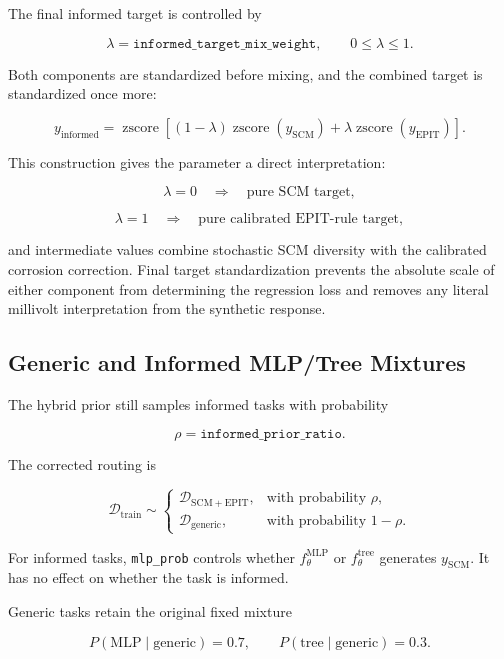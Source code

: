 \documentclass{article}
\begin{document}
The final informed target is controlled by

\[
\lambda
=
\texttt{informed\_target\_mix\_weight},
\qquad
0\leq\lambda\leq1.
\]

Both components are standardized before mixing, and the combined target is
standardized once more:

\begin{equation}
\label{eq:final-v7-scm-epit-target}
y_{\mathrm{informed}}
=
\operatorname{zscore}
\left[
(1-\lambda)
\operatorname{zscore}(y_{\mathrm{SCM}})
+
\lambda
\operatorname{zscore}(y_{\mathrm{EPIT}})
\right].
\end{equation}

This construction gives the parameter a direct interpretation:

\[
\lambda=0
\quad\Longrightarrow\quad
\text{pure SCM target},
\]

\[
\lambda=1
\quad\Longrightarrow\quad
\text{pure calibrated EPIT-rule target},
\]

and intermediate values combine stochastic SCM diversity with the calibrated
corrosion correction. Final target standardization prevents the absolute scale
of either component from determining the regression loss and removes any
literal millivolt interpretation from the synthetic response.

\subsection{Generic and Informed MLP/Tree Mixtures}

The hybrid prior still samples informed tasks with probability

\[
\rho
=
\texttt{informed\_prior\_ratio}.
\]

The corrected routing is

\[
\mathcal{D}_{\mathrm{train}}
\sim
\begin{cases}
\mathcal{D}_{\mathrm{SCM+EPIT}},
& \text{with probability }\rho,\\
\mathcal{D}_{\mathrm{generic}},
& \text{with probability }1-\rho.
\end{cases}
\]

For informed tasks, \texttt{mlp\_prob} controls whether
\(f_{\theta}^{\mathrm{MLP}}\) or \(f_{\theta}^{\mathrm{tree}}\) generates
\(y_{\mathrm{SCM}}\). It has no effect on whether the task is informed.

Generic tasks retain the original fixed mixture

\[
P(\mathrm{MLP}\mid\mathrm{generic})=0.7,
\qquad
P(\mathrm{tree}\mid\mathrm{generic})=0.3.
\]
\end{document}
